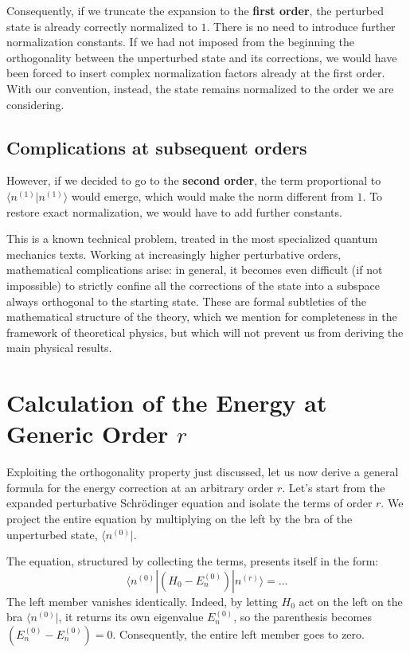 Consequently, if we truncate the expansion to the \textbf{first order}, the perturbed state is already correctly normalized to $1$. There is no need to introduce further normalization constants.
If we had not imposed from the beginning the orthogonality between the unperturbed state and its corrections, we would have been forced to insert complex normalization factors already at the first order. With our convention, instead, the state remains normalized to the order we are considering.

\subsection{Complications at subsequent orders}
However, if we decided to go to the \textbf{second order}, the term proportional to $\langle n^{(1)} \vert{} n^{(1)} \rangle$ would emerge, which would make the norm different from $1$. To restore exact normalization, we would have to add further constants.

This is a known technical problem, treated in the most specialized quantum mechanics texts. Working at increasingly higher perturbative orders, mathematical complications arise: in general, it becomes even difficult (if not impossible) to strictly confine all the corrections of the state into a subspace always orthogonal to the starting state. These are formal subtleties of the mathematical structure of the theory, which we mention for completeness in the framework of theoretical physics, but which will not prevent us from deriving the main physical results.

\section{Calculation of the Energy at Generic Order $r$}

Exploiting the orthogonality property just discussed, let us now derive a general formula for the energy correction at an arbitrary order $r$.
Let's start from the expanded perturbative Schrödinger equation and isolate the terms of order $r$. We project the entire equation by multiplying on the left by the bra of the unperturbed state, $\langle n^{(0)} \vert{}$.

The equation, structured by collecting the terms, presents itself in the form:
\begin{equation}
\langle n^{(0)} | \left( H_0 - E_n^{(0)} \right) | n^{(r)} \rangle = \dots
\end{equation}
The left member vanishes identically. Indeed, by letting $H_0$ act on the left on the bra $\langle n^{(0)} \vert{}$, it returns its own eigenvalue $E_n^{(0)}$, so the parenthesis becomes $(E_n^{(0)} - E_n^{(0)}) = 0$. Consequently, the entire left member goes to zero.

